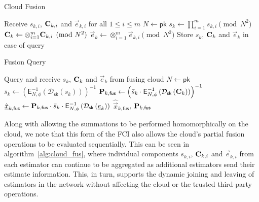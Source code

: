 \documentclass[letterpaper, 10 pt, conference]{ieeeconf}
\begin{document}
\begin{algorithm}[htbp]
\caption{Cloud Fusion}\label{alg:cloud_fus}
\begin{algorithmic}[1]
    \State Receive $s_{k,i}$, ${{\mathbf{C}}}_{k,i}$ and $\vec{e}_{k,i}$ for all $1\leq i \leq m$
    \State $N \gets \mathsf{pk}$
    \State $s_k \gets \prod_{i=1}^{m} s_{k,i} \pmod{N^2}$
    \State ${{\mathbf{C}}}_k \gets \otimes_{i=1}^{m} {{\mathbf{C}}}_{k,i} \pmod{N^2}$
    \State $\vec{e}_k \gets \otimes_{i=1}^{m} \vec{e}_{k,i} \pmod{N^2}$
    \State Store $s_k$, ${{\mathbf{C}}}_k$ and $\vec{e}_k$ in case of query
    \EndProcedure
\end{algorithmic}
\end{algorithm}
\begin{algorithm}[htbp]
\caption{Fusion Query}\label{alg:fus_query}
\begin{algorithmic}[1]
    \State Query and receive $s_k$, ${{\mathbf{C}}}_k$ and $\vec{e}_k$ from fusing cloud
    \State $N \gets \mathsf{pk}$
    \State $\bar{s}_k \gets \left(\mathsf{E}^{-1}_{N,\phi}\left(\mathcal{D}_{\mathsf{sk}}\left(s_k\right)\right)\right)^{-1}$
    \State ${{\mathbf{P}}}_{k,\mathsf{fus}} \gets \left(\bar{s}_k \cdot \mathsf{E}^{-1}_{N,\phi}\left(\mathcal{D}_{\mathsf{sk}}\left({{\mathbf{C}}}_k\right)\right)\right)^{-1}$
    \State $\hat{{\underline{x}}}_{k,\mathsf{fus}} \gets {\ensuremath{{\mathbf{P}}}}_{k,\mathsf{fus}} \cdot \bar{s}_k \cdot \mathsf{E}^{-1}_{N,\phi}\left(\mathcal{D}_{\mathsf{sk}}\left({\underline{e}}_k\right)\right)$
    \State \Return $\hat{\vec{x}}_{k,\mathsf{fus}}$, ${{\mathbf{P}}}_{k,\mathsf{fus}}$
    \EndProcedure
\end{algorithmic}
\end{algorithm}

Along with allowing the summations to be performed homomorphically on the cloud, we note that this form of the FCI also allows the cloud's partial fusion operations to be evaluated sequentially. This can be seen in algorithm~\ref{alg:cloud_fus}, where individual components $s_{k,i}$, ${{\mathbf{C}}}_{k,i}$ and $\vec{e}_{k,i}$ from each estimator can continue to be aggregated as additional estimators send their estimate information. This, in turn, supports the dynamic joining and leaving of estimators in the network without affecting the cloud or the trusted third-party operations.

% 
%                                 
%                                 
%                                 
% 
\end{document}
